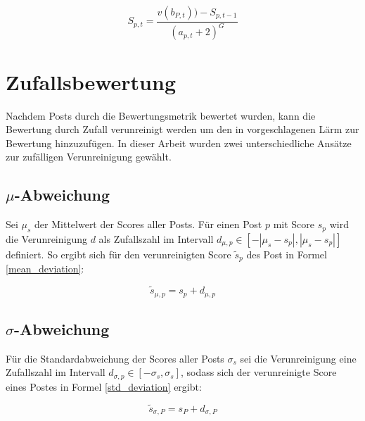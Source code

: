 \begin{equation}
\label{Activation}
S_{p,t} = \frac{v(b_{P,t})) - S_{p,t-1}}{(a_{p,t} + 2)^{G}}
\end{equation}


\section{Zufallsbewertung}

Nachdem Posts durch die Bewertungsmetrik bewertet wurden, kann die Bewertung durch Zufall verunreinigt werden um den in \cite{Luu} vorgeschlagenen Lärm zur Bewertung hinzuzufügen. In dieser Arbeit wurden zwei unterschiedliche Ansätze zur zufälligen Verunreinigung gewählt.

\subsection{$\mu$-Abweichung}

Sei $\mu_s$ der Mittelwert der Scores aller Posts. Für einen Post $p$ mit Score $s_p$ wird die Verunreinigung $d$ als Zufallszahl im Intervall $d_{\mu,p} \in [-|\mu_s - s_p|,|\mu_s - s_p|]$ definiert. So ergibt sich für den verunreinigten Score $\tilde{s}_p$ des Post in Formel \ref{mean_deviation}:

\begin{equation}
\label{mean_deviation}
\tilde{s}_{\mu,p} =  s_p + d_{\mu,p}
\end{equation} 

\subsection{$\sigma$-Abweichung}

Für die Standardabweichung der Scores aller Posts $\sigma_s$ sei die Verunreinigung eine Zufallszahl im Intervall $d_{\sigma,p} \in [-\sigma_s,\sigma_s]$, sodass sich der verunreinigte Score eines Postes in Formel \ref{std_deviation} ergibt:

\begin{equation}
\label{std_deviation}
\tilde{s}_{\sigma,P} = s_P + d_{\sigma,P}
\end{equation}

	
